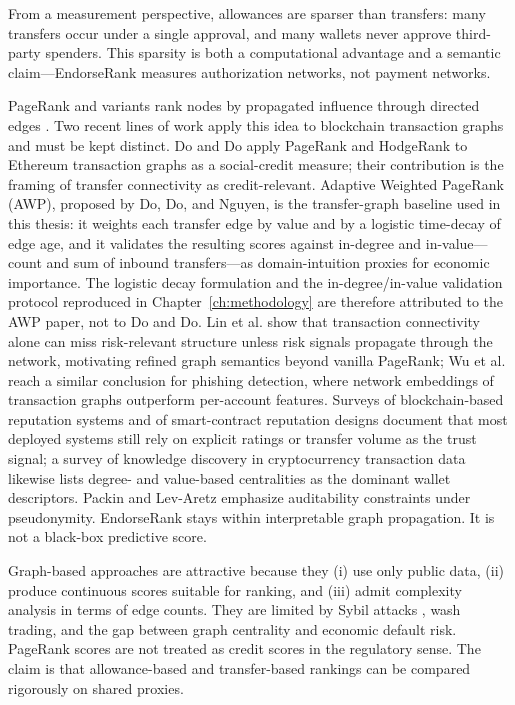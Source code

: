 From a measurement perspective, allowances are sparser than transfers: many transfers occur under a single approval, and many wallets never approve third-party spenders. This sparsity is both a computational advantage and a semantic claim---EndorseRank measures authorization networks, not payment networks.


PageRank and variants rank nodes by propagated influence through directed edges . Two recent lines of work apply this idea to blockchain transaction graphs and must be kept distinct. Do and Do apply PageRank and HodgeRank to Ethereum transaction graphs as a social-credit measure; their contribution is the framing of transfer connectivity as credit-relevant. Adaptive Weighted PageRank (AWP), proposed by Do, Do, and Nguyen, is the transfer-graph baseline used in this thesis: it weights each transfer edge by value and by a logistic time-decay of edge age, and it validates the resulting scores against in-degree and in-value---count and sum of inbound transfers---as domain-intuition proxies for economic importance. The logistic decay formulation and the in-degree/in-value validation protocol reproduced in Chapter~\ref{ch:methodology} are therefore attributed to the AWP paper, not to Do and Do. Lin et al. show that transaction connectivity alone can miss risk-relevant structure unless risk signals propagate through the network, motivating refined graph semantics beyond vanilla PageRank; Wu et al. reach a similar conclusion for phishing detection, where network embeddings of transaction graphs outperform per-account features. Surveys of blockchain-based reputation systems  and of smart-contract reputation designs  document that most deployed systems still rely on explicit ratings or transfer volume as the trust signal; a survey of knowledge discovery in cryptocurrency transaction data  likewise lists degree- and value-based centralities as the dominant wallet descriptors. Packin and Lev-Aretz emphasize auditability constraints under pseudonymity. EndorseRank stays within interpretable graph propagation. It is not a black-box predictive score.

Graph-based approaches are attractive because they (i) use only public data, (ii) produce continuous scores suitable for ranking, and (iii) admit complexity analysis in terms of edge counts. They are limited by Sybil attacks , wash trading, and the gap between graph centrality and economic default risk. PageRank scores are not treated as credit scores in the regulatory sense. The claim is that allowance-based and transfer-based rankings can be compared rigorously on shared proxies.

